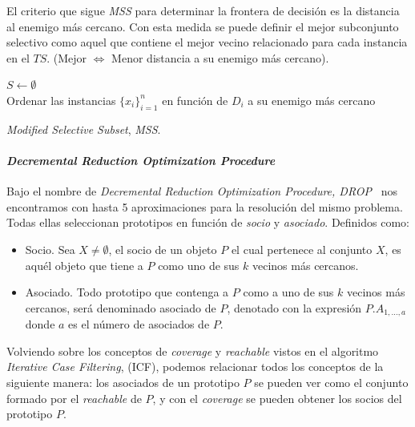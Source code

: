 El criterio que sigue \textit{MSS} para determinar la frontera de decisión es la distancia al enemigo más cercano. Con esta medida se puede definir el mejor subconjunto selectivo como aquel que contiene el mejor vecino relacionado para cada instancia en el $TS$. (Mejor $\iff$ Menor distancia a su enemigo más cercano).

\begin{algorithm}[H]
  	\BlankLine
  $S \leftarrow \emptyset$\\  	
  Ordenar las instancias $\lbrace x_i \rbrace^{n}_{i=1}$ en función de $D_i$ a su enemigo más cercano\\
	\caption{\textit{Modified Selective Subset}, \textit{MSS}.}\label{alg:Barandela-MSS}
\end{algorithm}

\paragraph{\textit{Decremental Reduction Optimization Procedure}}\label{paragraph:DROP}
\hfill \break
Bajo el nombre de \textit{Decremental Reduction Optimization Procedure, DROP}~\cite{wilson2000reduction} nos encontramos con hasta 5 aproximaciones para la resolución del mismo problema. Todas ellas seleccionan prototipos en función de \textit{socio} y \textit{asociado}. Definidos como:
\begin{itemize}
\item Socio. Sea $X \not= \emptyset$, el socio de un objeto $P$ el cual pertenece al conjunto $X$, es aquél objeto que tiene a $P$ como uno de sus $k$ vecinos más cercanos.
\item Asociado. Todo prototipo que contenga a $P$ como a uno de sus $k$ vecinos más cercanos, será denominado asociado de $P$, denotado con la expresión $P.A_{1,\dots,a}$ donde $a$ es el número de asociados de $P$.
\end{itemize}

Volviendo sobre los conceptos de \textit{coverage} y \textit{reachable} vistos en el algoritmo \textit{Iterative Case Filtering}, (ICF), podemos relacionar todos los conceptos de la siguiente manera: los asociados de un prototipo $P$ se pueden ver como el conjunto formado por el \textit{reachable} de $P$, y con el \textit{coverage} se pueden obtener los socios del prototipo $P$.

